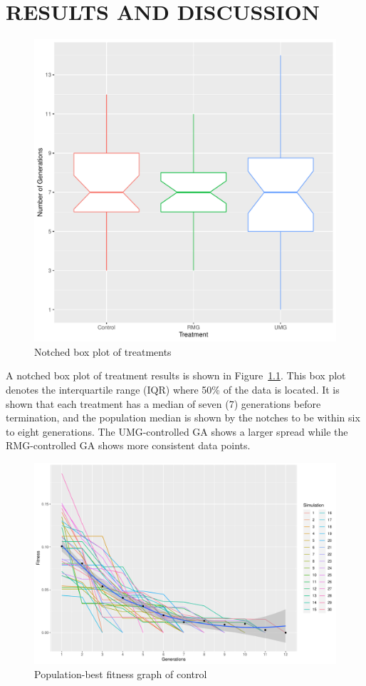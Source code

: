 \documentclass{strrespaper-trad}
\begin{document}
	\chapter{RESULTS AND DISCUSSION}
		\begin{figure}[htbp]
			\centering
			\includegraphics[width=\textwidth]{../figures/boxplot}
			\caption{Notched box plot of treatments}
			\label{fig:boxplot}
		\end{figure}

		A notched box plot of treatment results is shown in Figure~\ref{fig:boxplot}.
		This box plot denotes the interquartile range (IQR) where 50\% of the data is located.
		It is shown that each treatment has a median of seven (7) generations before termination, and the population median is shown by the notches to be within six to eight generations.
		The UMG-controlled GA shows a larger spread while the RMG-controlled GA shows more consistent data points.

		\begin{figure}[htbp]
			\centering
			\includegraphics[width=\textwidth]{../figures/ctrl_ftrack}
			\caption{Population-best fitness graph of control}
			\label{fig:fitgraph_ctrl}
		\end{figure}
\end{document}
